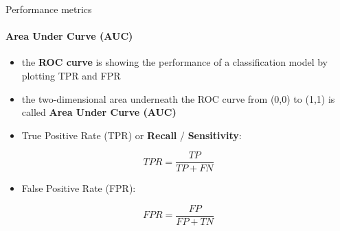 \begin{frame}{Performance metrics}
\framesubtitle{Area Under Curve (AUC)}

\begin{itemize}
    \item the \textbf{ROC curve} is showing the performance of a classification model by plotting TPR and FPR
    \item the two-dimensional area underneath the ROC curve from (0,0) to (1,1) is called \textbf{Area Under Curve (AUC)}
\end{itemize}

\begin{itemize}
    \item True Positive Rate (TPR) or \textbf{Recall} / \textbf{Sensitivity}:
\end{itemize}

$$ TPR=\frac{TP}{TP+FN} $$

\begin{itemize}
    \item False Positive Rate (FPR):
\end{itemize}

$$ FPR=\frac{FP}{FP+TN} $$

\end{frame}

